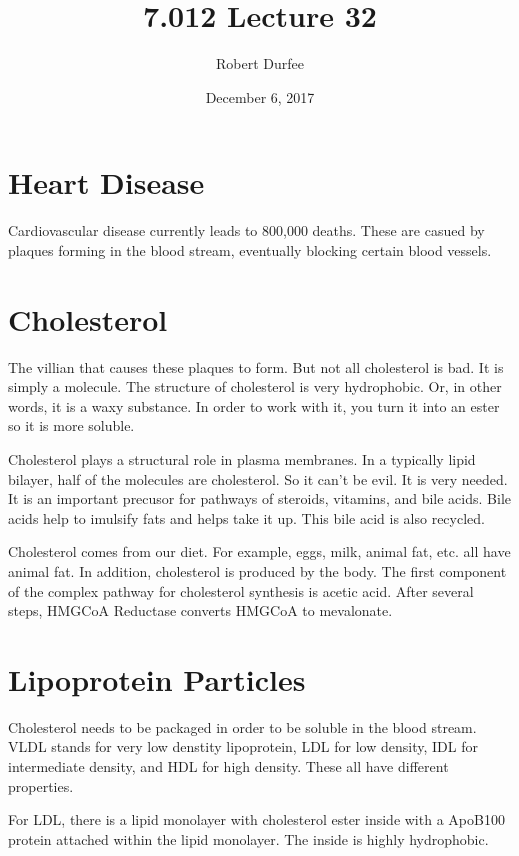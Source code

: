 \documentclass{article}
\title{ 7.012 Lecture 32 }
\author{ Robert Durfee }
\date{ December 6, 2017 }
\begin{document}
\maketitle

\section{ Heart Disease }

Cardiovascular disease currently leads to 800,000 deaths. These are casued by
plaques forming in the blood stream, eventually blocking certain blood vessels.

\section{ Cholesterol }

The villian that causes these plaques to form. But not all cholesterol is bad.
It is simply a molecule. The structure of cholesterol is very hydrophobic. Or,
in other words, it is a waxy substance. In order to work with it, you turn it
into an ester so it is more soluble.

Cholesterol plays a structural role in plasma membranes. In a typically lipid
bilayer, half of the molecules are cholesterol. So it can't be evil. It is very
needed. It is an important precusor for pathways of steroids, vitamins, and bile
acids. Bile acids help to imulsify fats and helps take it up. This bile acid is
also recycled. 

Cholesterol comes from our diet. For example, eggs, milk, animal fat, etc. all
have animal fat. In addition, cholesterol is produced by the body. The first
component of the complex pathway for cholesterol synthesis is acetic acid. After
several steps, HMGCoA Reductase converts HMGCoA to mevalonate.

\section{ Lipoprotein Particles }

Cholesterol needs to be packaged in order to be soluble in the blood stream.
VLDL stands for very low denstity lipoprotein, LDL for low density, IDL for
intermediate density, and HDL for high density. These all have different
properties.

For LDL, there is a lipid monolayer with cholesterol ester inside with a ApoB100
protein attached within the lipid monolayer. The inside is highly hydrophobic. 
\end{document}
